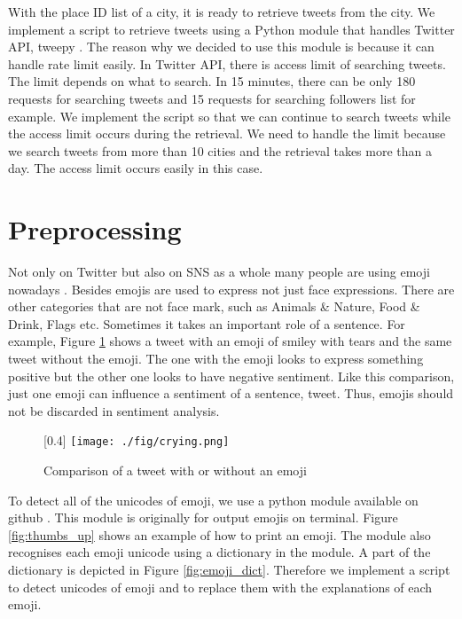 With the place ID list of a city, it is ready to retrieve tweets from the city.
We implement a script to retrieve tweets using a Python module that handles Twitter API, tweepy \cite{tweepy}.
The reason why we decided to use this module is because it can handle rate limit easily.
In Twitter API, there is access limit of searching tweets.
The limit depends on what to search.
In 15 minutes, there can be only 180 requests for searching tweets and 15 requests for searching followers list for example.
We implement the script so that we can continue to search tweets while the access limit occurs during the retrieval.
We need to handle the limit because we search tweets from more than 10 cities and the retrieval takes more than a day.
The access limit occurs easily in this case.

\section{Preprocessing}
Not only on Twitter but also on SNS as a whole many people are using emoji nowadays \cite{emoji}.
Besides emojis are used to express not just face expressions.
There are other categories that are not face mark, such as Animals \& Nature, Food \& Drink, Flags etc.
Sometimes it takes an important role of a sentence.
For example, Figure \ref{fig:crying} shows a tweet with an emoji of smiley with tears and the same tweet without the emoji.
The one with the emoji looks to express something positive but the other one looks to have negative sentiment.
Like this comparison, just one emoji can influence a sentiment of a sentence, tweet.
Thus, emojis should not be discarded in sentiment analysis.
\begin{figure}
	\centering
	\scalebox{0.4}[0.4]{
	\texttt{[image: ./fig/crying.png]}
	}
	\caption{Comparison of a tweet with or without an emoji}
	\label{fig:crying}
\end{figure}


To detect all of the unicodes of emoji, we use a python module available on github \cite{emoji_package}. 
This module is originally for output emojis on terminal.
Figure \ref{fig:thumbs_up} shows an example of how to print an emoji.
The module also recognises each emoji unicode using a dictionary in the module.
A part of the dictionary is depicted in Figure \ref{fig:emoji_dict}.
Therefore we implement a script to detect unicodes of emoji and to replace them with the explanations of each emoji.


